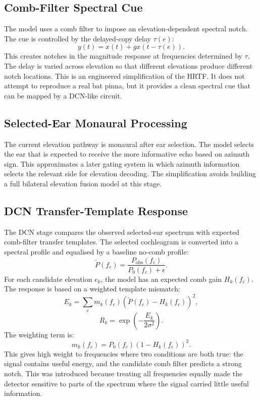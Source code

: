 \subsection{Comb-Filter Spectral Cue}

The model uses a comb filter to impose an elevation-dependent spectral notch. The cue is controlled by the delayed-copy delay $\tau(e)$:
\begin{equation}
    y(t)=x(t)+g x(t-\tau(e)).
\end{equation}
This creates notches in the magnitude response at frequencies determined by $\tau$. The delay is varied across elevation so that different elevations produce different notch locations. This is an engineered simplification of the HRTF. It does not attempt to reproduce a real bat pinna, but it provides a clean spectral cue that can be mapped by a DCN-like circuit.

\subsection{Selected-Ear Monaural Processing}

The current elevation pathway is monaural after ear selection. The model selects the ear that is expected to receive the more informative echo based on azimuth sign. This approximates a later gating system in which azimuth information selects the relevant side for elevation decoding. The simplification avoids building a full bilateral elevation fusion model at this stage.

\subsection{DCN Transfer-Template Response}

The DCN stage compares the observed selected-ear spectrum with expected comb-filter transfer templates. The selected cochleagram is converted into a spectral profile and equalised by a baseline no-comb profile:
\begin{equation}
    \tilde{P}(f_c) = \frac{P_{\text{obs}}(f_c)}{P_0(f_c)+\epsilon}.
\end{equation}
For each candidate elevation $e_k$, the model has an expected comb gain $H_k(f_c)$. The response is based on a weighted template mismatch:
\begin{equation}
    E_k = \sum_c m_k(f_c)\left(\tilde{P}(f_c)-H_k(f_c)\right)^2,
\end{equation}
\begin{equation}
    R_k = \exp\left(-\frac{E_k}{2\sigma^2}\right).
\end{equation}
The weighting term is:
\begin{equation}
    m_k(f_c)=P_0(f_c)\left(1-H_k(f_c)\right)^2.
\end{equation}
This gives high weight to frequencies where two conditions are both true: the signal contains useful energy, and the candidate comb filter predicts a strong notch. This was introduced because treating all frequencies equally made the detector sensitive to parts of the spectrum where the signal carried little useful information.

